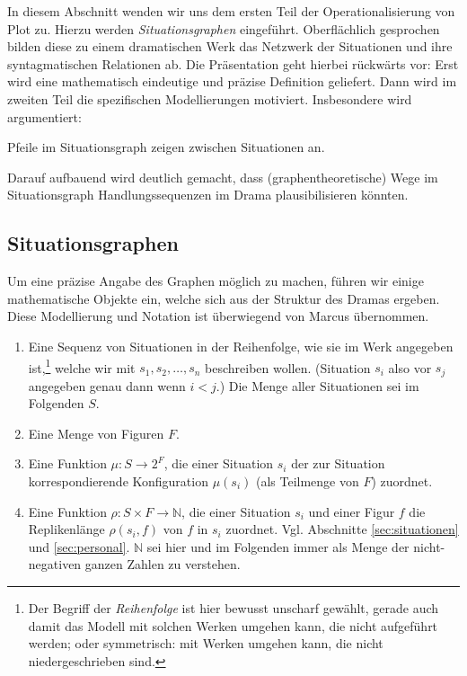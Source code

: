 \documentclass[a4paper,10pt,abstract=true,headings=small]{scrartcl}
\begin{document}
In diesem Abschnitt wenden wir uns dem ersten Teil der Operationalisierung von Plot zu.
Hierzu werden \emph{Situationsgraphen} eingeführt.
Oberflächlich gesprochen bilden diese zu einem dramatischen Werk das Netzwerk der Situationen und ihre syntagmatischen Relationen ab.
Die Präsentation geht hierbei rückwärts vor: Erst wird eine mathematisch eindeutige und präzise Definition geliefert.
Dann wird im zweiten Teil die spezifischen Modellierungen motiviert.
Insbesondere wird argumentiert:
\begin{enumerate*}
    \item Pfeile im Situationsgraph zeigen  zwischen Situationen an.
    \item Darauf aufbauend wird deutlich gemacht, dass (graphentheoretische) Wege im Situationsgraph Handlungssequenzen im Drama plausibilisieren könnten.
\end{enumerate*}

\subsection{Situationsgraphen}

Um eine präzise Angabe des Graphen möglich zu machen, führen wir einige mathematische Objekte ein, welche sich aus der Struktur des Dramas ergeben.
Diese Modellierung und Notation ist überwiegend von Marcus übernommen\autocite{marcus_mathematisch-linguistisches_1971}.

\begin{enumerate}[nosep] %
    \item Eine Sequenz von Situationen in der Reihenfolge, wie sie im Werk angegeben ist,\footnote{Der Begriff der \emph{Reihenfolge} ist hier bewusst unscharf gewählt, gerade auch damit das Modell mit solchen Werken umgehen kann, die nicht aufgeführt werden; oder symmetrisch: mit Werken umgehen kann, die nicht niedergeschrieben sind.} welche wir mit $s_1, s_2, \dots, s_n$ beschreiben wollen. (Situation $s_i$ also vor $s_j$ angegeben genau dann wenn $i<j$.) Die Menge aller Situationen sei im Folgenden $S$.
    \item Eine Menge von Figuren $F$. %
    \item Eine Funktion $\mu\colon S \to 2^F$, die einer Situation $s_i$ der zur Situation korrespondierende Konfiguration $\mu(s_i)$ (als Teilmenge von $F$) zuordnet.
    \item Eine Funktion $\rho\colon S\times F \to \mathbb{N}$, die einer Situation $s_i$ und einer Figur $f$ die Replikenlänge $\rho(s_i, f)$ von $f$ in $s_i$ zuordnet.
        Vgl. Abschnitte \ref{sec:situationen} und \ref{sec:personal}.
        $\mathbb{N}$ sei hier und im Folgenden immer als Menge der nicht-negativen ganzen Zahlen zu verstehen.
\end{enumerate}
\end{document}
